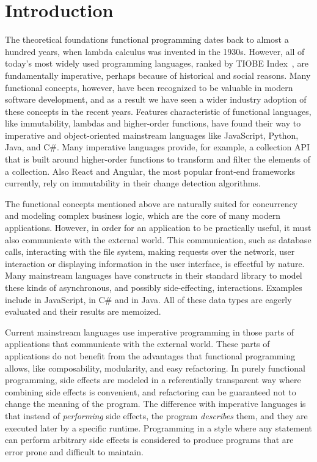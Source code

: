 \chapter{Introduction} \label{Introduction}
The theoretical foundations functional programming dates back to almost a hundred years, when lambda calculus was invented in the 1930s. However, all of today's most widely used programming languages, ranked by TIOBE Index~\cite{tiobe-index}, are fundamentally imperative, perhaps because of historical and social reasons. Many functional concepts, however, have been recognized to be valuable in modern software development, and as a result we have seen a wider industry adoption of these concepts in the recent years. Features characteristic of functional languages, like immutability, lambdas and higher-order functions, have found their way to imperative and object-oriented mainstream languages like JavaScript, Python, Java, and C\#. Many imperative languages provide, for example, a collection API that is built around higher-order functions to transform and filter the elements of a collection. Also React and Angular, the most popular front-end frameworks currently, rely on immutability in their change detection algorithms.

The functional concepts mentioned above are naturally suited for concurrency and modeling complex business logic, which are the core of many modern applications. However, in order for an application to be practically useful, it must also communicate with the external world. This communication, such as database calls, interacting with the file system, making requests over the network, user interaction or displaying information in the user interface, is effectful by nature. Many mainstream languages have constructs in their standard library to model these kinds of asynchronous, and possibly side-effecting, interactions. Examples include  in JavaScript,  in C\# and  in Java.  All of these data types are eagerly evaluated and their results are memoized.

Current mainstream languages use imperative programming in those parts of applications that communicate with the external world. These parts of applications do not benefit from the advantages that functional programming allows, like composability, modularity, and easy refactoring. In purely functional programming, side effects are modeled in a referentially transparent way where combining side effects is convenient, and refactoring can be guaranteed not to change the meaning of the program. The difference with imperative languages is that instead of \textit{performing} side effects, the program \textit{describes} them, and they are executed later by a specific runtime. Programming in a style where any statement can perform arbitrary side effects is considered to produce programs that are error prone and difficult to maintain.~\cite[Chapter~3]{sicp}

